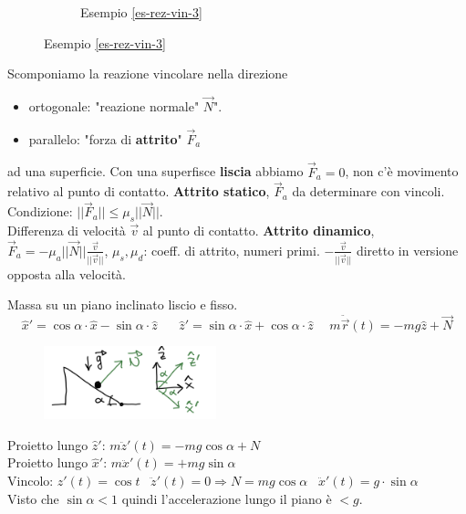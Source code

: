 \begin{figure}[h!]
\begin{subfigure}[b]{0.25\textwidth}
        \caption*{Esempio \ref{es-rez-vin-3}}
    \end{subfigure}
\end{figure}
\hspace{-15pt}Scomponiamo la reazione vincolare nella direzione
\begin{itemize}
    \item ortogonale: "reazione normale" $\vec{N}$".
    \item parallelo: "forza di \textbf{attrito}" $\vec{F}_a$
\end{itemize}
ad una superficie. Con una superfisce \textbf{liscia} abbiamo $\vec{F}_a = 0$, non c'è
movimento relativo al punto di contatto. \textbf{Attrito statico}, $\vec{F}_a$ da determinare con vincoli. Condizione: $||\vec{F}_a|| \leq \mu_s ||\vec{N}||$.\\
Differenza di velocità $\vec{v}$ al punto di contatto. \textbf{Attrito dinamico}, $\vec{F}_a = -\mu_a ||\vec{N}||\frac{\vec{v}}{||\vec{v}||}$, $\mu_s, \mu_d$: coeff. di attrito, numeri primi.
$-\frac{\vec{v}}{||\vec{v}||}$ diretto in versione opposta alla velocità.

\begin{example}
    Massa su un piano inclinato liscio e fisso.
    $$\hat{x}' = \cos\alpha \cdot \hat{x} - \sin\alpha \cdot \hat{z} \hspace{20pt}\hat{z}' = \sin\alpha \cdot \hat{x} + \cos\alpha \cdot \hat{z} \hspace{15pt} m\ddot{\vec{r}}(t) = -mg\hat{z} + \vec{N}$$
    \begin{figure}
        \vspace{-15pt}
        \centering
        \includegraphics[width=5cm]{images/esempio-reazione-vincolare-4.png}
    \end{figure}
    
    Proietto lungo $\hat{z}'$: \hspace{15pt} $m\ddot{z}'(t) = -mg\cos\alpha + N$\\
    Proietto lungo $\hat{x}'$: \hspace{15pt} $m\ddot{x}'(t) = +mg\sin\alpha$\\
    Vincolo: $z'(t) = \cos t \hspace{10pt} \ddot{z}'(t) = 0 \Rightarrow N = mg\cos\alpha \hspace{10pt} \ddot{x}'(t) = g \cdot \sin\alpha$\\
    Visto che $\sin\alpha < 1$ quindi l'accelerazione lungo il piano è $< g$.
\end{example}

